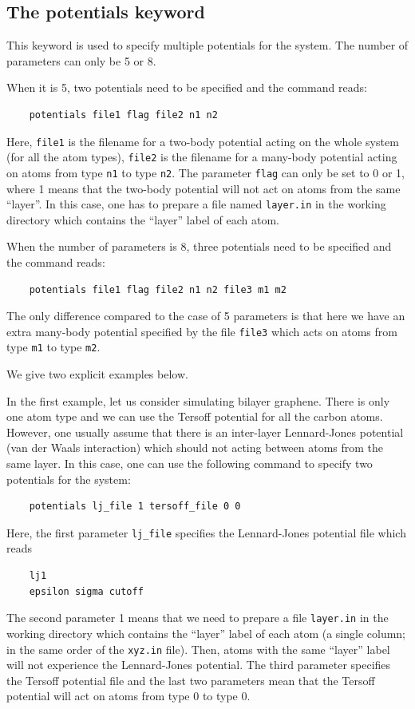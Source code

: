 \documentclass[12pt,a4paper]{report}
\begin{document}
\subsection{The potentials keyword}

This keyword is used to specify multiple potentials for the system. The number of parameters can only be 5 or 8. 

When it is 5, two potentials need to be specified and the command reads:
\begin{verbatim}
    potentials file1 flag file2 n1 n2
\end{verbatim}
Here, \verb"file1" is the filename for a two-body potential acting on the whole system (for all the atom types), \verb"file2" is the filename for a many-body potential acting on atoms from type \verb"n1" to type \verb"n2". The parameter \verb"flag" can only be set to 0 or 1, where 1 means that the two-body potential will not act on atoms from the same ``layer''. In this case, one has to prepare a file named \verb"layer.in" in the working directory which contains the ``layer'' label of each atom.

When the number of parameters is 8, three potentials need to be specified and the command reads:
\begin{verbatim}
    potentials file1 flag file2 n1 n2 file3 m1 m2
\end{verbatim}
The only difference compared to the case of 5 parameters is that here we have an extra many-body potential specified by the file \verb"file3" which acts on atoms from type \verb"m1" to type \verb"m2".

We give two explicit examples below.

In the first example, let us consider simulating bilayer graphene. There is only one atom type and we can use the Tersoff potential for all the carbon atoms. However, one usually assume that there is an inter-layer Lennard-Jones potential (van der Waals interaction) which should not acting between atoms from the same layer. In this case, one can use the following command to specify two potentials for the system:
\begin{verbatim}
    potentials lj_file 1 tersoff_file 0 0
\end{verbatim}
Here,  the first parameter \verb"lj_file" specifies the Lennard-Jones potential file which reads 
\begin{verbatim}
    lj1
    epsilon sigma cutoff
\end{verbatim}
The second parameter 1 means that we need to prepare a file \verb"layer.in" in the working directory which contains the ``layer'' label of each atom (a single column; in the same order of the \verb"xyz.in" file). Then, atoms with the same ``layer'' label will not experience the Lennard-Jones potential. The third parameter specifies the Tersoff potential file and the last two parameters mean that the Tersoff potential will act on atoms from type 0 to type 0.
\end{document}
